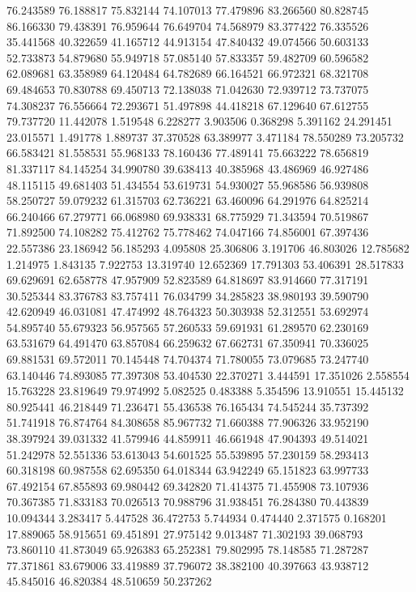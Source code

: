 76.243589
76.188817
75.832144
74.107013
77.479896
83.266560
80.828745
86.166330
79.438391
76.959644
76.649704
74.568979
83.377422
76.335526
35.441568
40.322659
41.165712
44.913154
47.840432
49.074566
50.603133
52.733873
54.879680
55.949718
57.085140
57.833357
59.482709
60.596582
62.089681
63.358989
64.120484
64.782689
66.164521
66.972321
68.321708
69.484653
70.830788
69.450713
72.138038
71.042630
72.939712
73.737075
74.308237
76.556664
72.293671
51.497898
44.418218
67.129640
67.612755
79.737720
11.442078
1.519548
6.228277
3.903506
0.368298
5.391162
24.291451
23.015571
1.491778
1.889737
37.370528
63.389977
3.471184
78.550289
73.205732
66.583421
81.558531
55.968133
78.160436
77.489141
75.663222
78.656819
81.337117
84.145254
34.990780
39.638413
40.385968
43.486969
46.927486
48.115115
49.681403
51.434554
53.619731
54.930027
55.968586
56.939808
58.250727
59.079232
61.315703
62.736221
63.460096
64.291976
64.825214
66.240466
67.279771
66.068980
69.938331
68.775929
71.343594
70.519867
71.892500
74.108282
75.412762
75.778462
74.047166
74.856001
67.397436
22.557386
23.186942
56.185293
4.095808
25.306806
3.191706
46.803026
12.785682
1.214975
1.843135
7.922753
13.319740
12.652369
17.791303
53.406391
28.517833
69.629691
62.658778
47.957909
52.823589
64.818697
83.914660
77.317191
30.525344
83.376783
83.757411
76.034799
34.285823
38.980193
39.590790
42.620949
46.031081
47.474992
48.764323
50.303938
52.312551
53.692974
54.895740
55.679323
56.957565
57.260533
59.691931
61.289570
62.230169
63.531679
64.491470
63.857084
66.259632
67.662731
67.350941
70.336025
69.881531
69.572011
70.145448
74.704374
71.780055
73.079685
73.247740
63.140446
74.893085
77.397308
53.404530
22.370271
3.444591
17.351026
2.558554
15.763228
23.819649
79.974992
5.082525
0.483388
5.354596
13.910551
15.445132
80.925441
46.218449
71.236471
55.436538
76.165434
74.545244
35.737392
51.741918
76.874764
84.308658
85.967732
71.660388
77.906326
33.952190
38.397924
39.031332
41.579946
44.859911
46.661948
47.904393
49.514021
51.242978
52.551336
53.613043
54.601525
55.539895
57.230159
58.293413
60.318198
60.987558
62.695350
64.018344
63.942249
65.151823
63.997733
67.492154
67.855893
69.980442
69.342820
71.414375
71.455908
73.107936
70.367385
71.833183
70.026513
70.988796
31.938451
76.284380
70.443839
10.094344
3.283417
5.447528
36.472753
5.744934
0.474440
2.371575
0.168201
17.889065
58.915651
69.451891
27.975142
9.013487
71.302193
39.068793
73.860110
41.873049
65.926383
65.252381
79.802995
78.148585
71.287287
77.371861
83.679006
33.419889
37.796072
38.382100
40.397663
43.938712
45.845016
46.820384
48.510659
50.237262
